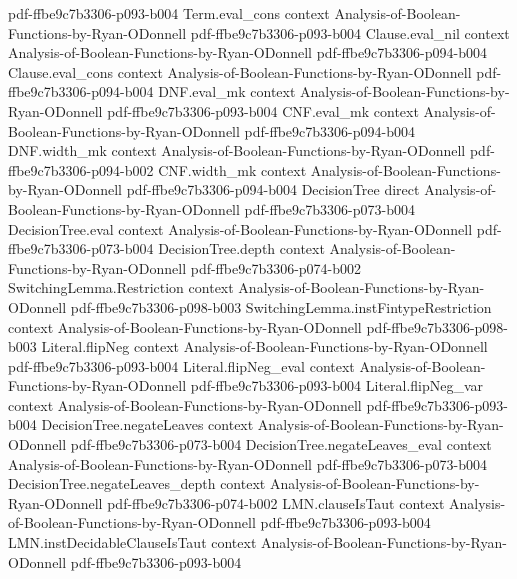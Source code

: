 \begin{lemma}
  {pdf-ffbe9c7b3306-p093-b004}
\proofstep
  {Term.eval_cons}
  {context}
  {Analysis-of-Boolean-Functions-by-Ryan-ODonnell}
  {pdf-ffbe9c7b3306-p093-b004}
\proofstep
  {Clause.eval_nil}
  {context}
  {Analysis-of-Boolean-Functions-by-Ryan-ODonnell}
  {pdf-ffbe9c7b3306-p094-b004}
\proofstep
  {Clause.eval_cons}
  {context}
  {Analysis-of-Boolean-Functions-by-Ryan-ODonnell}
  {pdf-ffbe9c7b3306-p094-b004}
\proofstep
  {DNF.eval_mk}
  {context}
  {Analysis-of-Boolean-Functions-by-Ryan-ODonnell}
  {pdf-ffbe9c7b3306-p093-b004}
\proofstep
  {CNF.eval_mk}
  {context}
  {Analysis-of-Boolean-Functions-by-Ryan-ODonnell}
  {pdf-ffbe9c7b3306-p094-b004}
\proofstep
  {DNF.width_mk}
  {context}
  {Analysis-of-Boolean-Functions-by-Ryan-ODonnell}
  {pdf-ffbe9c7b3306-p094-b002}
\proofstep
  {CNF.width_mk}
  {context}
  {Analysis-of-Boolean-Functions-by-Ryan-ODonnell}
  {pdf-ffbe9c7b3306-p094-b004}
\proofstep
  {DecisionTree}
  {direct}
  {Analysis-of-Boolean-Functions-by-Ryan-ODonnell}
  {pdf-ffbe9c7b3306-p073-b004}
\proofstep
  {DecisionTree.eval}
  {context}
  {Analysis-of-Boolean-Functions-by-Ryan-ODonnell}
  {pdf-ffbe9c7b3306-p073-b004}
\proofstep
  {DecisionTree.depth}
  {context}
  {Analysis-of-Boolean-Functions-by-Ryan-ODonnell}
  {pdf-ffbe9c7b3306-p074-b002}
\proofstep
  {SwitchingLemma.Restriction}
  {context}
  {Analysis-of-Boolean-Functions-by-Ryan-ODonnell}
  {pdf-ffbe9c7b3306-p098-b003}
\proofstep
  {SwitchingLemma.instFintypeRestriction}
  {context}
  {Analysis-of-Boolean-Functions-by-Ryan-ODonnell}
  {pdf-ffbe9c7b3306-p098-b003}
\proofstep
  {Literal.flipNeg}
  {context}
  {Analysis-of-Boolean-Functions-by-Ryan-ODonnell}
  {pdf-ffbe9c7b3306-p093-b004}
\proofstep
  {Literal.flipNeg_eval}
  {context}
  {Analysis-of-Boolean-Functions-by-Ryan-ODonnell}
  {pdf-ffbe9c7b3306-p093-b004}
\proofstep
  {Literal.flipNeg_var}
  {context}
  {Analysis-of-Boolean-Functions-by-Ryan-ODonnell}
  {pdf-ffbe9c7b3306-p093-b004}
\proofstep
  {DecisionTree.negateLeaves}
  {context}
  {Analysis-of-Boolean-Functions-by-Ryan-ODonnell}
  {pdf-ffbe9c7b3306-p073-b004}
\proofstep
  {DecisionTree.negateLeaves_eval}
  {context}
  {Analysis-of-Boolean-Functions-by-Ryan-ODonnell}
  {pdf-ffbe9c7b3306-p073-b004}
\proofstep
  {DecisionTree.negateLeaves_depth}
  {context}
  {Analysis-of-Boolean-Functions-by-Ryan-ODonnell}
  {pdf-ffbe9c7b3306-p074-b002}
\proofstep
  {LMN.clauseIsTaut}
  {context}
  {Analysis-of-Boolean-Functions-by-Ryan-ODonnell}
  {pdf-ffbe9c7b3306-p093-b004}
\proofstep
  {LMN.instDecidableClauseIsTaut}
  {context}
  {Analysis-of-Boolean-Functions-by-Ryan-ODonnell}
  {pdf-ffbe9c7b3306-p093-b004}

\end{lemma}
